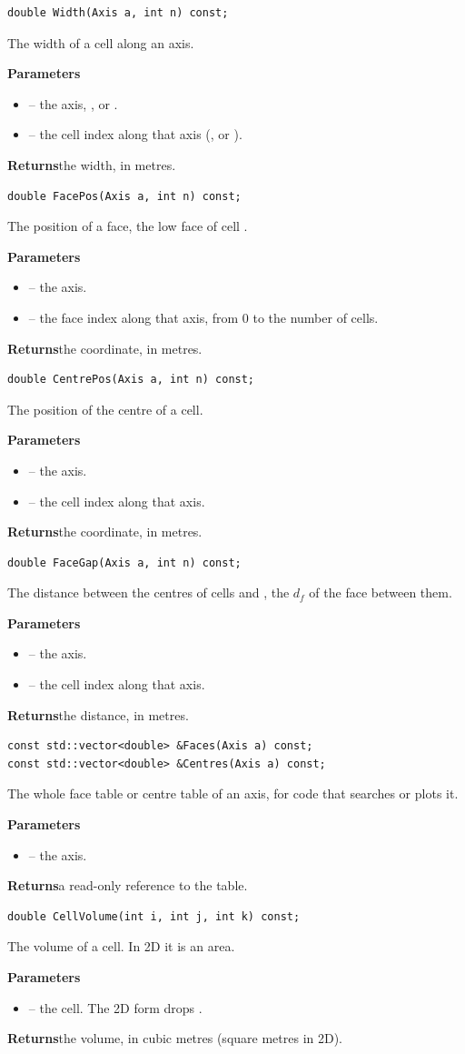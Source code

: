 \documentclass[10pt,a4paper]{article}
\newcommand{\code}[1]{\texttt{\detokenize{#1}}}
\newenvironment{params}{\par\noindent\textbf{Parameters}\begin{itemize}[leftmargin=1.4em,itemsep=0pt,topsep=1pt,parsep=0pt]}{\end{itemize}}
\newcommand{\p}[2]{\item \code{#1} -- #2}
\newcommand{\returns}[1]{\par\noindent\textbf{Returns}\quad #1\par}
\begin{document}
\begin{lstlisting}[style=sig]
double Width(Axis a, int n) const;
\end{lstlisting}
The width of a cell along an axis.
\begin{params}
\p{a}{the axis, \code{MAC::X}, \code{Y} or \code{Z}.}
\p{n}{the cell index along that axis (\code{j}, \code{i} or \code{k}).}
\end{params}
\returns{the width, in metres.}

\begin{lstlisting}[style=sig]
double FacePos(Axis a, int n) const;
\end{lstlisting}
The position of a face, the low face of cell \code{n}.
\begin{params}
\p{a}{the axis.}
\p{n}{the face index along that axis, from 0 to the number of cells.}
\end{params}
\returns{the coordinate, in metres.}

\begin{lstlisting}[style=sig]
double CentrePos(Axis a, int n) const;
\end{lstlisting}
The position of the centre of a cell.
\begin{params}
\p{a}{the axis.}
\p{n}{the cell index along that axis.}
\end{params}
\returns{the coordinate, in metres.}

\begin{lstlisting}[style=sig]
double FaceGap(Axis a, int n) const;
\end{lstlisting}
The distance between the centres of cells \code{n} and \code{n+1}, the $d_f$ of the face between them.
\begin{params}
\p{a}{the axis.}
\p{n}{the cell index along that axis.}
\end{params}
\returns{the distance, in metres.}

\begin{lstlisting}[style=sig]
const std::vector<double> &Faces(Axis a) const;
const std::vector<double> &Centres(Axis a) const;
\end{lstlisting}
The whole face table or centre table of an axis, for code that searches or plots it.
\begin{params}
\p{a}{the axis.}
\end{params}
\returns{a read-only reference to the table.}

\begin{lstlisting}[style=sig]
double CellVolume(int i, int j, int k) const;
\end{lstlisting}
The volume of a cell. In 2D it is an area.
\begin{params}
\p{i, j, k}{the cell. The 2D form drops \code{k}.}
\end{params}
\returns{the volume, in cubic metres (square metres in 2D).}
\end{document}
